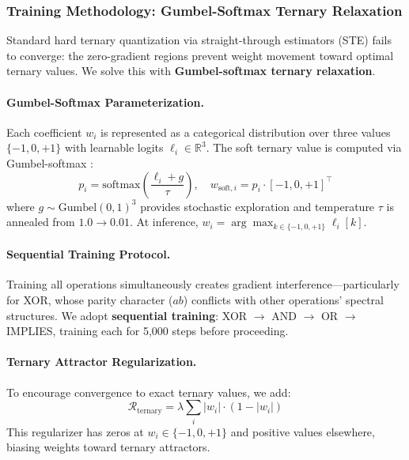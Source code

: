 \documentclass[Royal,times,sageh]{sagej}
\begin{document}
\subsubsection{Training Methodology: Gumbel-Softmax Ternary Relaxation}
\label{sec:phase1_training}

Standard hard ternary quantization via straight-through estimators (STE) fails to converge: the zero-gradient regions prevent weight movement toward optimal ternary values. We solve this with \textbf{Gumbel-softmax ternary relaxation}.

\paragraph{Gumbel-Softmax Parameterization.}
Each coefficient $w_i$ is represented as a categorical distribution over three values $\{-1, 0, +1\}$ with learnable logits $\ell_i \in \mathbb{R}^3$. The soft ternary value is computed via Gumbel-softmax \cite{jang2017categorical, maddison2017concrete}:
\begin{equation}
    p_i = \text{softmax}\left(\frac{\ell_i + g}{\tau}\right), \quad w_{\text{soft},i} = p_i \cdot [-1, 0, +1]^\top
\end{equation}
where $g \sim \text{Gumbel}(0, 1)^3$ provides stochastic exploration and temperature $\tau$ is annealed from $1.0 \to 0.01$. At inference, $w_i = \arg\max_{k \in \{-1,0,+1\}} \ell_i[k]$.

\paragraph{Sequential Training Protocol.}
Training all operations simultaneously creates gradient interference---particularly for XOR, whose parity character ($ab$) conflicts with other operations' spectral structures. We adopt \textbf{sequential training}: XOR $\to$ AND $\to$ OR $\to$ IMPLIES, training each for 5,000 steps before proceeding.

\paragraph{Ternary Attractor Regularization.}
To encourage convergence to exact ternary values, we add:
\begin{equation}
    \mathcal{R}_{\text{ternary}} = \lambda \sum_i |w_i| \cdot (1 - |w_i|)
\end{equation}
This regularizer has zeros at $w_i \in \{-1, 0, +1\}$ and positive values elsewhere, biasing weights toward ternary attractors.
\end{document}
